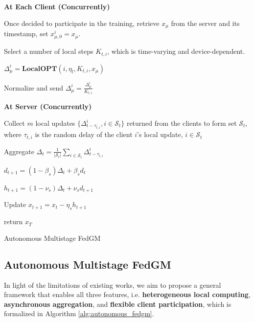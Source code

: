 \begin{algorithm2e}[tb]
\SetAlgoVlined
{}
\SetAlgoLined
{}
{
{   
    \colorbox{babyblueeyes}{\textbf{At Each Client (Concurrently)}}
    
    Once decided to participate in the training, retrieve $x_\mu$ from the server and its timestamp, set $x_{\mu,0}^i=x_\mu$.

    Select a number of local steps $K_{t,i}$, which is time-varying and device-dependent.

    $\Delta_\mu^i=\textbf{LocalOPT}\left(i,\eta_l,K_{t,i},x_\mu\right)$

    Normalize and send $\Delta_\mu^i=\frac{\Delta_\mu^i}{K_{t,i}}$
    

    \colorbox{babyblueeyes}{\textbf{At Server (Concurrently)}}
    
    Collect $m$ local updates $\{\Delta_{t-\tau_{t,i}}^i, i\in\mathcal{S}_t\}$ returned from the clients to form set $\mathcal{S}_t$, where $\tau_{t,i}$ is the random delay of the client $i$'s local update, $i\in\mathcal{S}_t$

    Aggregate $\Delta_t=\frac{1}{\lvert\mathcal{S}_t\rvert}\sum_{i\in \mathcal{S}_t}\Delta_{t-\tau_{t,i}}^i$

    $d_{t+1}=(1-\beta_s)\Delta_{t}+\beta_s d_{t}$

    $h_{t+1}=(1-\nu_s)\Delta_{t}+\nu_s d_{t+1}$
        
    Update $x_{t+1}=x_t-\eta_s h_{t+1}$

}
}
return $x_T$
\caption{\colorbox{babyblueeyes}{Autonomous Multistage FedGM}}
\label{alg:autonomous_fedgm}
\end{algorithm2e}

\fi

\subsection{Autonomous Multistage FedGM}

In light of the limitations of existing works, we aim to propose a general framework that enables all three features, i.e. \textbf{heterogeneous local computing}, \textbf{asynchronous aggregation}, and \textbf{flexible client participation}, which is formalized in Algorithm \ref{alg:autonomous_fedgm}.

